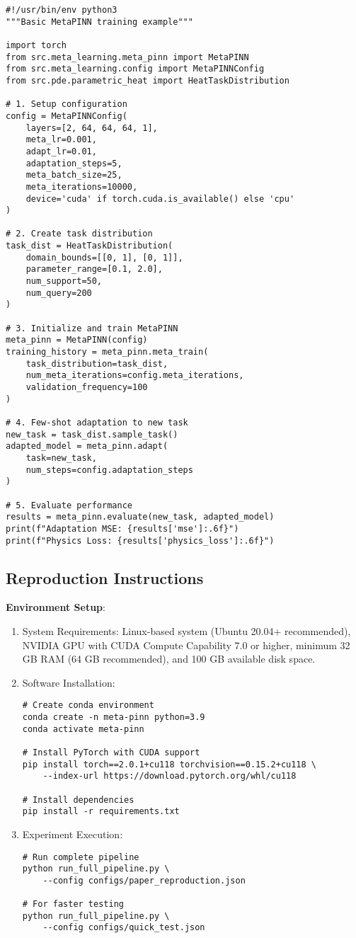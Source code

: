 \documentclass[review]{elsarticle}
\begin{document}
\begin{verbatim}
#!/usr/bin/env python3
"""Basic MetaPINN training example"""

import torch
from src.meta_learning.meta_pinn import MetaPINN
from src.meta_learning.config import MetaPINNConfig
from src.pde.parametric_heat import HeatTaskDistribution

# 1. Setup configuration
config = MetaPINNConfig(
    layers=[2, 64, 64, 64, 1],
    meta_lr=0.001,
    adapt_lr=0.01,
    adaptation_steps=5,
    meta_batch_size=25,
    meta_iterations=10000,
    device='cuda' if torch.cuda.is_available() else 'cpu'
)

# 2. Create task distribution
task_dist = HeatTaskDistribution(
    domain_bounds=[[0, 1], [0, 1]],
    parameter_range=[0.1, 2.0],
    num_support=50,
    num_query=200
)

# 3. Initialize and train MetaPINN
meta_pinn = MetaPINN(config)
training_history = meta_pinn.meta_train(
    task_distribution=task_dist,
    num_meta_iterations=config.meta_iterations,
    validation_frequency=100
)

# 4. Few-shot adaptation to new task
new_task = task_dist.sample_task()
adapted_model = meta_pinn.adapt(
    task=new_task,
    num_steps=config.adaptation_steps
)

# 5. Evaluate performance
results = meta_pinn.evaluate(new_task, adapted_model)
print(f"Adaptation MSE: {results['mse']:.6f}")
print(f"Physics Loss: {results['physics_loss']:.6f}")
\end{verbatim}

\subsection{Reproduction Instructions}

\textbf{Environment Setup}:

\begin{enumerate}
\item System Requirements: Linux-based system (Ubuntu 20.04+ recommended), NVIDIA GPU with CUDA Compute Capability 7.0 or higher, minimum 32 GB RAM (64 GB recommended), and 100 GB available disk space.

\item Software Installation:
\begin{verbatim}
# Create conda environment
conda create -n meta-pinn python=3.9
conda activate meta-pinn

# Install PyTorch with CUDA support
pip install torch==2.0.1+cu118 torchvision==0.15.2+cu118 \
    --index-url https://download.pytorch.org/whl/cu118

# Install dependencies
pip install -r requirements.txt
\end{verbatim}

\item Experiment Execution:
\begin{verbatim}
# Run complete pipeline
python run_full_pipeline.py \
    --config configs/paper_reproduction.json

# For faster testing
python run_full_pipeline.py \
    --config configs/quick_test.json
\end{verbatim}
\end{enumerate}
\end{document}
